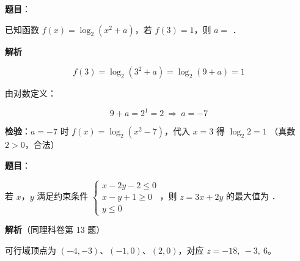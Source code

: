 \begin{answer}

\textbf{题目}：

已知函数 $f(x)=\log_2\left(x^{2}+a\right)$，若 $f(3)=1$，则 $a=$ \gkblank{}．

\textbf{解析}

\nopagebreak[4]
\[f(3)=\log_2\left(3^{2}+a\right)=\log_2(9+a)=1\]

由对数定义：

\nopagebreak[4]
\[9+a=2^{1}=2\ \Longrightarrow\ a=-7\]

\textbf{检验}：$a=-7$ 时 $f(x)=\log_2\left(x^{2}-7\right)$，代入 $x=3$ 得 $\log_2 2=1$ （真数 $2>0$，合法）


\par\medskip

\end{answer}
\begin{answer}

\textbf{题目}：

若 $x$，$y$ 满足约束条件 $\begin{cases}x-2y-2\le0\\ x-y+1\ge0\\ y\le0\end{cases}$，则 $z=3x+2y$ 的最大值为 \gkblank{}．

\textbf{解析}（同理科卷第 13 题）

可行域顶点为 $(-4,-3)$、$(-1,0)$、$(2,0)$，对应 $z=-18,\ -3,\ 6$。


\par\medskip

\end{answer}
